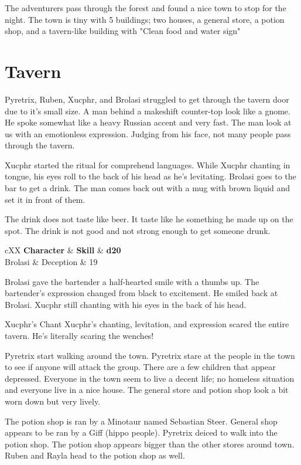 The adventurers pass through the forest and found a nice town to stop for the night.
The town is tiny with 5 buildings; two houses, a general store, a potion shop, and a tavern-like building with "Clean food and water sign"

\section*{Tavern}
Pyretrix, Ruben, Xucphr, and Brolasi struggled to get through the tavern door due to it's small size.
A man behind a makeshift counter-top look like a gnome. He spoke somewhat like a heavy Russian accent and very fast.
The man look at us with an emotionless expression.
Judging from his face, not many people pass through the tavern.

Xucphr started the ritual for comprehend languages. 
While Xucphr chanting in tongue, his eyes roll to the back of his head as he's levitating.
Brolasi goes to the bar to get a drink. The man comes back out with a mug with brown liquid and set it in front of them.

The drink does not taste like beer. It taste like he something he made up on the spot.
The drink is not good and not strong enough to get someone drunk.

\begin{DndTable}[color=PhbLightCyan]{cXX}
	\textbf{Character} & \textbf{Skill} & \textbf{d20} \\
	Brolasi & Deception  & 19 \\
\end{DndTable}

Brolasi gave the bartender a half-hearted smile with a thumbs up.
The bartender's expression changed from black to excitement. He smiled back at Brolasi.
Xucphr still chanting with his eyes in the back of his head.

\begin{DndSidebar}{Xucphr's Chant}
	Xucphr's chanting, levitation, and expression scared the entire tavern.
	He's literally scaring the wenches!
\end{DndSidebar}

Pyretrix start walking around the town. Pyretrix stare at the people in the town to see if anyone will attack the group.
There are a few children that appear depressed. 
Everyone in the town seem to live a decent life; no homeless situation and everyone live in a nice house.
The general store and potion shop look a bit worn down but very lively.

The potion shop is ran by a Minotaur named Sebastian Steer. 
General shop appears to  be ran by a Giff (hippo people). Pyretrix deiced to walk into the potion shop.
The potion shop appears bigger than the other stores around town. Ruben and Rayla head to the potion shop as well.

